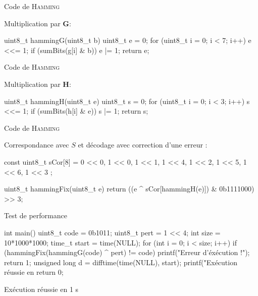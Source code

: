 \documentclass[french,bookmarks,aspectratio=43]{beamer}
\newcommand{\bbG}{\mathbf{G}}
\newcommand{\bbH}{\mathbf{H}}
\begin{document}
\begin{frame}[fragile]{Code de \textsc{Hamming}}

Multiplication par $\bbG$:
    \begin{C}
uint8_t hammingG(uint8_t b)
{
    uint8_t e = 0;
    for (uint8_t i = 0; i < 7; i++) {
        e <<= 1;
        if (sumBits(g[i] & b)) e |= 1;
    }
    return e;
}
    \end{C}
\end{frame}

\begin{frame}[fragile]{Code de \textsc{Hamming}}

Multiplication par $\bbH$:
    \begin{C}
uint8_t hammingH(uint8_t e)
{
    uint8_t s = 0;
    for (uint8_t i = 0; i < 3; i++)
    {
        s <<= 1;
        if (sumBits(h[i] & e)) s |= 1;
    }
    return s;
}
    \end{C}
\end{frame}

\begin{frame}[fragile]{Code de \textsc{Hamming}}

Correspondance avec $S$ et décodage avec correction d'une erreur :
    \begin{C}
const uint8_t sCor[8] =
        {
                0 << 0,
                1 << 0,
                1 << 1,
                1 << 4,
                1 << 2,
                1 << 5,
                1 << 6,
                1 << 3
        };

uint8_t hammingFix(uint8_t e) {
    return ((e ^ sCor[hammingH(e)]) & 0b1111000)
    >> 3;
}

    \end{C}
\end{frame}

\begin{frame}[fragile]{Test de performance}

    \begin{C}
int main() {
    uint8_t code = 0b1011;
    uint8_t pert = 1 << 4;
    int size = 10*1000*1000;
    time_t start = time(NULL);
    for (int i = 0; i < size; i++)
        if (hammingFix(hammingG(code) ^ pert)
        != code) {
            printf("Erreur d'éxécution !\n");
            return 1;
    }
    unsigned long d = difftime(time(NULL), start);
    printf("Exécution réussie en %
    return 0;
}
    \end{C}
    \begin{outputlog}
Exécution réussie en 1 s
    \end{outputlog}
\end{frame}
\end{document}
